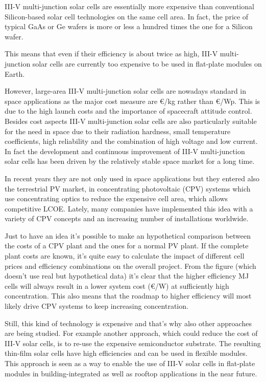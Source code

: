 \documentclass[11pt]{article} %
\begin{document}
III-V multi-junction solar  cells  are essentially more expensive than conventional Silicon-based solar cell technologies on the same cell area. In fact, the price of typical GaAs or Ge wafers is more or less a hundred times the one for a Silicon wafer. 

This means that even if their efficiency is about twice as high, III-V multi-junction solar cells are currently too expensive to be used in flat-plate modules on Earth.   

However, large-area III-V multi-junction solar cells are nowadays standard in space applications as the major cost measure are €/kg rather than €/Wp. This is due to the high launch costs and the importance of spacecraft attitude control. Besides cost aspects III-V multi-junction solar cells  are  also  particularly  suitable  for  the  need  in  space  due  to  their  radiation  hardness,  small temperature coefficients, high reliability and the combination of high voltage and low current. In fact the development and continuous improvement of III-V multi-junction solar cells has been driven by the relatively stable space market for a long time.  

 In recent years they are not  only used in space applications but they entered also the terrestrial PV market, in  concentrating  photovoltaic  (CPV)  systems which use  concentrating  optics  to  reduce  the  expensive  cell  area,  which  allows  competitive  LCOE.  Lately, many  companies  have  implemented  this  idea  with  a  variety  of  CPV  concepts  and  an  increasing number of installations worldwide.   

Just to have an idea it’s possible to make an hypothetical comparison between the costs of a CPV plant and the ones for a normal PV plant. If the complete plant costs are known, it’s quite easy to calculate the impact of different cell prices and efficiency combinations on the overall project. From the figure (which doesn’t use real but hypothetical data) it’s clear that the higher efficiency MJ cells will always result in a lower system cost (€/W) at sufficiently high concentration. This also means that the roadmap to higher efficiency will most likely drive CPV systems to keep increasing concentration.   

Still, this kind of technology is expensive and that’s why also other approaches are being studied. For example another  approach, which  could  reduce  the cost  of  III-V  solar  cells,  is  to re-use  the  expensive semiconductor substrate. The resulting thin-film solar cells have high efficiencies and can be used in flexible modules. This approach is  seen  as  a  way  to  enable  the  use  of  III-V  solar  cells  in  flat-plate modules in building-integrated as well as rooftop applications in the near future. 
\end{document}
